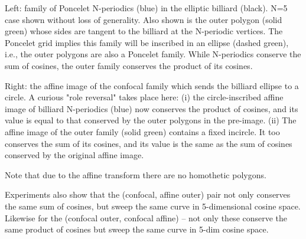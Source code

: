 Left: family of Poncelet N-periodics (blue) in the elliptic billiard (black). N=5 case shown without loss of generality. Also shown is the outer polygon (solid green) whose sides are tangent to the billiard at the N-periodic vertices. The Poncelet grid implies this family will be inscribed in an ellipse (dashed green), i.e., the outer polygons are also a Poncelet family. While N-periodics conserve the sum of cosines, the outer family conserves the product of its cosines.

Right: the affine image of the confocal family which sends the billiard ellipse to a circle. A curious "role reversal" takes place here: (i) the circle-inscribed affine image of billiard N-periodics (blue) now conserves the product of cosines, and its value is equal to that conserved by the outer polygons in the pre-image. (ii) The affine image of the outer family (solid green) contains a fixed incircle. It too conserves the sum of its cosines, and its value is the same as the sum of cosines conserved by the original affine image.

Note that due to the affine transform there are no homothetic polygons.

Experiments also show that the (confocal, affine outer) pair not only conserves the same sum of cosines, but sweep the same curve in 5-dimensional cosine space. Likewise for the (confocal outer, confocal affine) -- not only these conserve the same product of cosines but sweep the same curve in 5-dim cosine space.